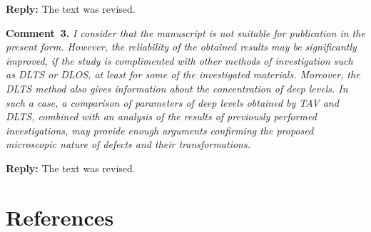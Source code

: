 \documentclass[10pt]{iopart}
\begin{document}
\noindent
\textcolor[rgb]{0.51,0.00,0.00}{\textbf{Reply:}}
The text was revised.

\vspace{1cm}
\noindent
\textcolor[rgb]{0.00,0.50,1.00}{\textbf{Comment~3.}}
\emph{I consider that the manuscript is not suitable for publication in the present form.
However, the reliability of the obtained results may be significantly improved,
if the study is complimented with other methods of investigation such as DLTS or DLOS,
at least for some of the investigated materials.
Moreover, the DLTS method also gives information about the concentration of deep levels.
In such a case, a comparison of parameters of deep levels obtained by TAV and DLTS,
combined with an analysis of the results of previously performed investigations,
may provide enough arguments confirming the
proposed microscopic nature of defects and their transformations.}

\noindent
\textcolor[rgb]{0.51,0.00,0.00}{\textbf{Reply:}}
The text was revised.


\section*{References}



\end{document}
